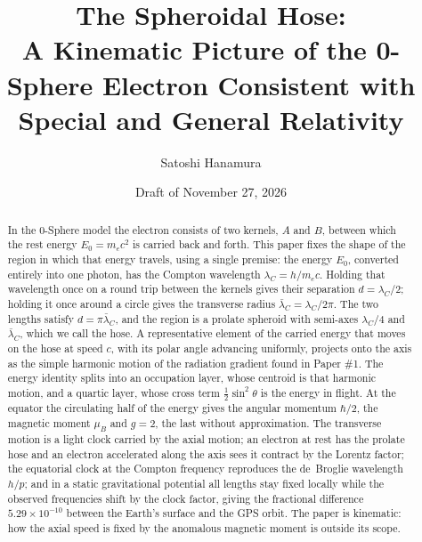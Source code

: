 \documentclass[%
 reprint, amsmath,amssymb, aps, prb, ]{revtex4-2}
\numberwithin{equation}{section}
\newcommand{\lamC}{\lambda_C}
\newcommand{\lbar}{\bar{\lambda}_C}
\begin{document}
\title{The Spheroidal Hose:\\A Kinematic Picture of the 0-Sphere Electron Consistent with Special and General Relativity}

\author{Satoshi Hanamura}

\date{Draft of November 27, 2026}

\begin{abstract}
In the 0-Sphere model the electron consists of two kernels, $A$ and $B$, between which the rest energy $E_0 = m_ec^2$ is carried back and forth.
This paper fixes the shape of the region in which that energy travels, using a single premise: the energy $E_0$, converted entirely into one photon, has the Compton wavelength $\lamC = h/m_ec$.
Holding that wavelength once on a round trip between the kernels gives their separation $d = \lamC/2$; holding it once around a circle gives the transverse radius $\lbar = \lamC/2\pi$.
The two lengths satisfy $d = \pi\lbar$, and the region is a prolate spheroid with semi-axes $\lamC/4$ and $\lbar$, which we call the hose.
A representative element of the carried energy that moves on the hose at speed $c$, with its polar angle advancing uniformly, projects onto the axis as the simple harmonic motion of the radiation gradient found in Paper \#1.
The energy identity splits into an occupation layer, whose centroid is that harmonic motion, and a quartic layer, whose cross term $\tfrac12\sin^2\theta$ is the energy in flight.
At the equator the circulating half of the energy gives the angular momentum $\hbar/2$, the magnetic moment $\mu_B$ and $g = 2$, the last without approximation.
The transverse motion is a light clock carried by the axial motion; an electron at rest has the prolate hose and an electron accelerated along the axis sees it contract by the Lorentz factor; the equatorial clock at the Compton frequency reproduces the de~Broglie wavelength $h/p$; and in a static gravitational potential all lengths stay fixed locally while the observed frequencies shift by the clock factor, giving the fractional difference $5.29\times10^{-10}$ between the Earth's surface and the GPS orbit.
The paper is kinematic: how the axial speed is fixed by the anomalous magnetic moment is outside its scope.
\end{abstract}
\end{document}
